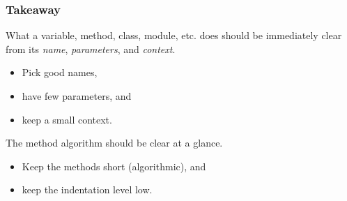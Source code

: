 \begin{frame}

\frametitle{Takeaway}

\vspace{\fill}

\begin{center}

What a variable, method, class, module, etc. does should be immediately
clear from its \emph{name}, \emph{parameters}, and \emph{context}.

\end{center}

\begin{itemize}

\item Pick good names,

\item have few parameters, and

\item keep a small context.

\end{itemize}

\vspace{\fill}

\begin{center}

The method algorithm should be clear at a glance.

\end{center}

\begin{itemize}

\item Keep the methods short (algorithmic), and

\item keep the indentation level low.

\end{itemize}

\vspace{\fill}

\end{frame}
